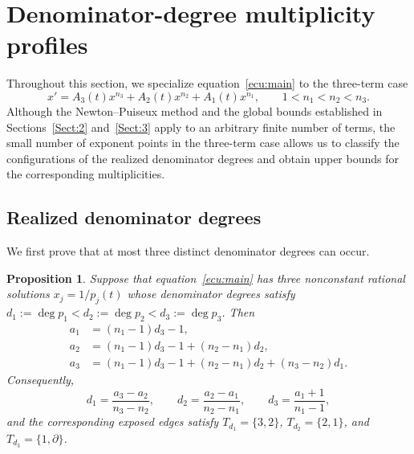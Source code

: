 \documentclass[12pt,a4paper]{amsart}
\numberwithin{theorem}{section}
\newtheorem{proposition}[theorem]{Proposition}
\theoremstyle{definition}
\begin{document}
	\section{Denominator-degree multiplicity profiles}%
	
	Throughout this section, we specialize equation~\eqref{ecu:main} to the three-term case
	\[
	x'=A_3(t)x^{n_3}+A_2(t)x^{n_2}+A_1(t)x^{n_1},\qquad 1<n_1<n_2<n_3.
	\]
	Although the Newton--Puiseux method and the global bounds established in Sections~\ref{Sect:2} and~\ref{Sect:3} apply to an arbitrary finite number of terms, the small number of exponent points in the three-term case allows us to classify the configurations of the realized denominator degrees and obtain upper bounds for the corresponding multiplicities.
	
	\subsection{Realized denominator degrees}%
	
	We first prove that at most three distinct denominator degrees can occur.
	
	\begin{proposition}\label{prop:three-distinct-degrees}
		Suppose that equation~\eqref{ecu:main} has three nonconstant rational solutions $x_j=1/p_j(t)$ whose denominator degrees satisfy $d_1:=\deg p_1<d_2:=\deg p_2<d_3:=\deg p_3$. Then
		\begin{align}
			a_1&=(n_1-1)d_3-1,\label{eq:three-degrees-a1}\\
			a_2&=(n_1-1)d_3-1+(n_2-n_1)d_2,\label{eq:three-degrees-a2}\\
			a_3&=(n_1-1)d_3-1+(n_2-n_1)d_2+(n_3-n_2)d_1.\label{eq:three-degrees-a3}
		\end{align}
		Consequently,
		\[
		d_1=\frac{a_3-a_2}{n_3-n_2},\qquad d_2=\frac{a_2-a_1}{n_2-n_1},\qquad d_3=\frac{a_1+1}{n_1-1},
		\]
		and the corresponding exposed edges satisfy $T_{d_1}=\{3,2\}$, $T_{d_2}=\{2,1\}$, and $T_{d_3}=\{1,\partial\}$.
	\end{proposition}
	
\end{document}
